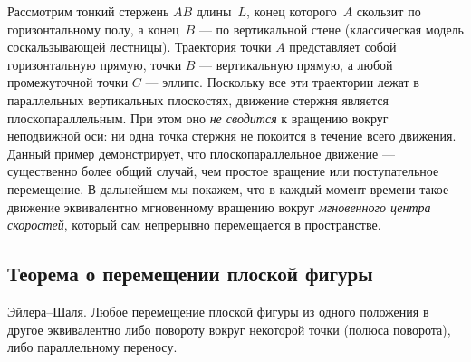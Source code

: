 \documentclass[../main.tex]{subfiles}
\begin{document}
\begin{example}
Рассмотрим тонкий стержень $AB$ длины~$L$, конец которого~$A$ скользит
по горизонтальному полу, а конец~$B$ --- по вертикальной стене
(классическая модель соскальзывающей лестницы). Траектория точки $A$
представляет собой горизонтальную прямую, точки $B$ --- вертикальную
прямую, а любой промежуточной точки $C$ --- эллипс. Поскольку все эти
траектории лежат в параллельных вертикальных плоскостях, движение
стержня является плоскопараллельным. При этом оно \textit{не сводится}
к вращению вокруг неподвижной оси: ни одна точка стержня не покоится
в течение всего движения. Данный пример демонстрирует, что
плоскопараллельное движение --- существенно более общий случай, чем
простое вращение или поступательное перемещение. В дальнейшем мы
покажем, что в каждый момент времени такое движение эквивалентно
мгновенному вращению вокруг \textit{мгновенного центра скоростей},
который сам непрерывно перемещается в пространстве.
\end{example}

\subsection{Теорема о перемещении плоской фигуры}

\begin{theorem}
Эйлера--Шаля. Любое перемещение плоской фигуры из одного положения в другое
эквивалентно либо повороту вокруг некоторой точки (полюса поворота),
либо параллельному переносу.
\end{theorem}
\end{document}
